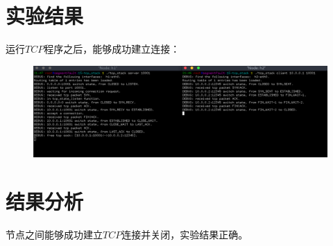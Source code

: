 \documentclass[UTF8,noindent]{ctexart}
\begin{document}
\section{{实验结果}}

运行$TCP$程序之后，能够成功建立连接：
\begin{figure}[H]
  \centering
  \includegraphics[scale = 0.3]{1.png}
\end{figure}

\section{{结果分析}}
节点之间能够成功建立$TCP$连接并关闭，实验结果正确。
\end{document}
